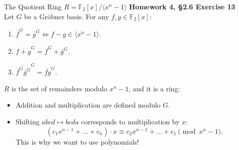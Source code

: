 \documentclass[handout]{beamer}
\newcommand{\F}{\mathbb{F}}
\begin{document}
\begin{frame}{The Quotient Ring $R = \F_2[x]/\langle x^n - 1\rangle$}
    \textbf{Homework 4, \S2.6 Exercise 13} \\
    Let $G$ be a Gr\"obner basis. For any $f,g \in \F_2[x]$:
    \begin{enumerate}
        \item $\overline{f}^G = \overline{g}^G \iff f-g \in \langle x^n-1\rangle$.
        \item $\overline{f+g}^G = \overline{f}^G + \overline{g}^G$.
        \item $\overline{\overline{f}^G\overline{g}^G}^G = \overline{fg}^G$.
    \end{enumerate}
    \vspace{0.3cm}
    $R$ is the set of remainders modulo $x^n-1$, and it is a ring:
    \begin{itemize}
        \item Addition and multiplication are defined modulo $G$.
        \item Shifting $abcd \mapsto bcda$ corresponds to multiplication by $x$:
        \[(c_1 x^{n-1} + \dots + c_n) \cdot x \equiv c_2 x^{n-1} + \dots + c_1 \pmod{x^n-1}. \]
        This is why we want to use polynomials!
    \end{itemize}
\end{frame}
\end{document}
